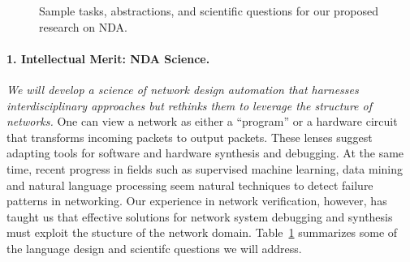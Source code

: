
\begin{figure}[t]
\centerline{}
\caption{Sample tasks, abstractions, and scientific questions for our
  proposed research on NDA.}
\vspace{2mm}
\label{scientificquestions}
\end{figure}


\paragraph*{1. Intellectual Merit: NDA Science.} {\em We will develop a science of network design automation that harnesses interdisciplinary approaches but rethinks them to leverage the structure of networks.} One can view a network as either a ``program'' or a hardware circuit that transforms incoming packets to output packets.  These lenses suggest adapting tools for software and hardware synthesis and debugging.  At the same time, recent progress in fields such as supervised machine learning, data mining and natural language processing seem natural techniques to detect failure patterns in networking.  Our experience in network verification, however, has taught us
that effective solutions for network system debugging and synthesis must exploit the stucture of the network domain.  
Table~\ref{scientificquestions} summarizes some of the language design and scientifc questions we will address.

